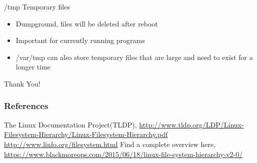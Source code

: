 \documentclass{beamer}
\begin{document}
\begin{frame}{/tmp Temporary files}
\begin{itemize}
\setlength\itemsep{0.8em}
\item Dumpground, files will be deleted after reboot
\item  Important for currently running programs
\pause
\item /var/tmp can also store temporary files that are large and need to exist for a longer time 
\end{itemize}

\end{frame}

\begin{frame}
\addtocounter{framenumber}{-1}


\begin{center}
\Huge{{Thank You}!}
\end{center}




\end{frame}

\begin{frame} 
\addtocounter{framenumber}{-1}

\frametitle{\color{black} References}
\footnotesize{
\begin{thebibliography}{99}
{
 \color{black} The Linux Documentation Project(TLDP), \url{http://www.tldp.org/LDP/Linux-Filesystem-Hierarchy/Linux-Filesystem-Hierarchy.pdf}
 \color{black} \url{http://www.linfo.org/filesystem.html}
 \color{black}Find a complete overview here,  \url{https://www.blackmoreops.com/2015/06/18/linux-file-system-hierarchy-v2-0/}
}

\end{thebibliography}
}
\end{frame}
\end{document}
